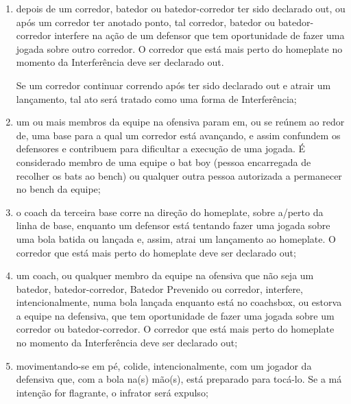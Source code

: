 \begin{enumerate}[label=(\alph*)]
\begin{enumerate}[label=\roman*.]
	 Se essa Interferência, na opinião do árbitro, é uma evidente tentativa de evitar um \gls{doubleplay} (jogada dupla), o corredor subsequente imediato deve também ser declarado \gls{out}. O batedor-corredor volta a bater, com um \gls{strike} adicional pela bola \gls{foul}, se a contagem de arremessos anterior à batida era menos de dois \glspl{strike}. Se essa Interferência causar  terceiro \gls{out}, o batedor-corredor voltará a bater como o primeiro batedor no próximo \gls{inning}, com a contagem original de \gls{ball} e \gls{strike} cancelada;

	\item depois de um corredor, batedor ou batedor-corredor ter sido declarado \gls{out}, ou após um corredor ter anotado ponto, tal corredor, batedor ou batedor-corredor interfere na ação de um defensor que tem oportunidade de fazer uma jogada sobre outro corredor. O corredor que está mais perto do \gls{homeplate} no momento da Interferência deve ser declarado \gls{out}.

	 Se um corredor continuar correndo após ter sido declarado \gls{out} e atrair um lançamento, tal ato será tratado como uma forma de Interferência;

	\item um ou mais membros da equipe na ofensiva param em, ou se reúnem ao redor de, uma base para a qual um corredor está avançando, e assim confundem os defensores e contribuem para dificultar a execução de uma  jogada. É considerado membro de uma equipe o \gls{bat boy} (pessoa encarregada de recolher os \glspl{bat} ao \gls{bench}) ou qualquer outra pessoa autorizada a permanecer no \gls{bench} da equipe;

	\item o \gls{coach} da terceira base corre na direção do \gls{homeplate}, sobre a/perto da linha de base, enquanto um defensor está tentando fazer uma jogada sobre uma bola batida ou lançada e, assim, atrai um lançamento ao \gls{homeplate}. O corredor que está mais perto do \gls{homeplate} deve ser  declarado \gls{out};

	\item um \gls{coach}, ou qualquer membro da equipe na ofensiva que não seja um batedor, batedor-corredor, Batedor Prevenido ou corredor, interfere,  intencionalmente, numa bola lançada enquanto está no \gls{coachsbox}, ou estorva a equipe na defensiva, que tem oportunidade de fazer uma jogada sobre um corredor ou batedor-corredor. O corredor que está mais perto do \gls{homeplate} no momento da Interferência deve ser declarado \gls{out};
	\item movimentando-se em pé, colide, intencionalmente, com um jogador da defensiva que, com a bola na(s) mão(s), está preparado para tocá-lo. Se  a má intenção for flagrante, o infrator será expulso;


\end{enumerate}
\end{enumerate}

